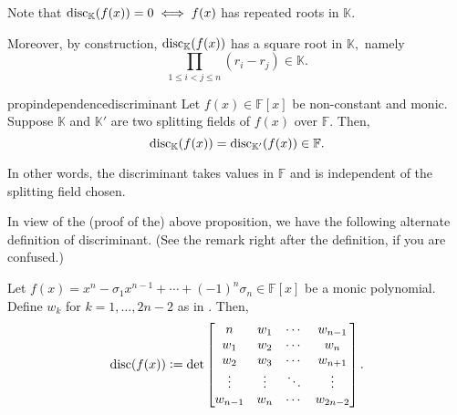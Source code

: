 \begin{rem} \label{rem:discrepeatedroots}
    Note that $\operatorname{disc}_{\mathbb{K}}(f(x)) = 0 \iff f(x)$ has repeated roots in $\mathbb{K}.$

    Moreover, by construction, $\operatorname{disc}_{\mathbb{K}}(f(x))$ has a square root in $\mathbb{K},$ namely
    \begin{equation*} 
        \prod_{1 \le i < j \le n} (r_i - r_j) \in \mathbb{K}.
    \end{equation*}
\end{rem}

\begin{restatable}[]{prop}{independencediscriminant}
\label{prop:independencediscriminant}
    Let $f(x) \in \mathbb{F}[x]$ be non-constant and monic. Suppose $\mathbb{K}$ and $\mathbb{K}'$ are two splitting fields of $f(x)$ over $\mathbb{F}.$ Then,
    \begin{equation*} 
        \operatorname{disc}_{\mathbb{K}}(f(x)) = \operatorname{disc}_{\mathbb{K}'}(f(x)) \in \mathbb{F}.
    \end{equation*} 

    In other words, the discriminant takes values in $\mathbb{F}$ and is independent of the splitting field chosen. \hfill\hyperref[prop:independencediscriminant2]{\downsym}
\end{restatable}

In view of the (proof of the) above proposition, we have the following alternate definition of discriminant. (See the remark right after the definition, if you are confused.)

\begin{defn}%
    Let $f(x) = x^n - \sigma_1x^{n - 1} + \cdots + (-1)^n\sigma_n \in \mathbb{F}[x]$ be a monic polynomial. Define $w_k$ for $k = 1, \ldots, 2n - 2$ as in . Then, 
    \begin{equation*} 
        \operatorname{disc}(f(x)) \vcentcolon= \det \begin{bmatrix}
            n & w_1 & \cdots & w_{n - 1}\\
            w_1 & w_2 & \cdots & w_n\\
            w_2 & w_3 & \cdots & w_{n + 1}\\
            \vdots & \vdots & \ddots & \vdots \\
            w_{n - 1} & w_n & \cdots & w_{2n - 2}\\
        \end{bmatrix}.
    \end{equation*}
\end{defn}

